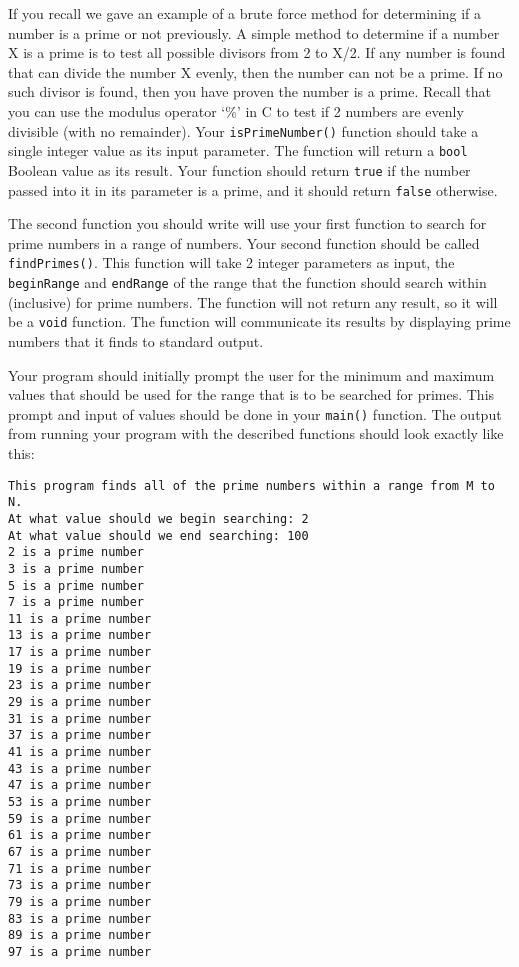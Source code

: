\documentclass[11pt]{article}
\begin{document}
If you recall we gave an example of a brute force method for determining
if a number is a prime or not previously.  A simple method to
determine if a number X is a prime is to test all possible
divisors from 2 to X/2.  If any number is found that can divide
the number X evenly, then the number can not be a prime.  If
no such divisor is found, then you have proven the number is
a prime.  Recall that you can use the modulus operator `\%'
in C to test if 2 numbers are evenly divisible (with no
remainder).  Your \verb~isPrimeNumber()~ function should take
a single integer value as its input parameter.  The function
will return a \verb~bool~ Boolean value as its result.  Your function
should return \verb~true~ if the number passed into it in its
parameter is a prime, and it should return \verb~false~ otherwise.

The second function you should write will use your first function
to search for prime numbers in a range of numbers.  Your
second function should be called \verb~findPrimes()~.  This function
will take 2 integer parameters as input, the \verb~beginRange~ and
\verb~endRange~ of the range that the function should search
within (inclusive) for prime numbers.  The function
will not return any result, so it will be a \verb~void~ function.
The function will communicate its results by displaying
prime numbers that it finds to standard output.  

Your program should initially prompt the user for the minimum and
maximum values that should be used for the range that is to be
searched for primes.  This prompt and input of values should be done
in your \verb~main()~ function.  The output from running your program
with the described functions should look exactly like this:


\begin{verbatim}
This program finds all of the prime numbers within a range from M to N.
At what value should we begin searching: 2
At what value should we end searching: 100
2 is a prime number
3 is a prime number
5 is a prime number
7 is a prime number
11 is a prime number
13 is a prime number
17 is a prime number
19 is a prime number
23 is a prime number
29 is a prime number
31 is a prime number
37 is a prime number
41 is a prime number
43 is a prime number
47 is a prime number
53 is a prime number
59 is a prime number
61 is a prime number
67 is a prime number
71 is a prime number
73 is a prime number
79 is a prime number
83 is a prime number
89 is a prime number
97 is a prime number
\end{verbatim}
\end{document}
